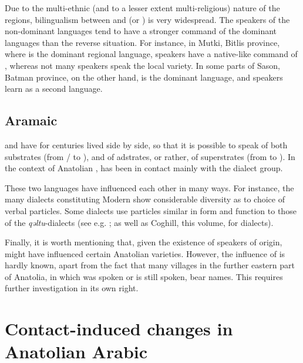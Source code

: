 \documentclass[output=paper]{langsci/langscibook}
\begin{document}
Due to the multi-ethnic (and to a lesser extent multi-religious) nature of the regions, {bilingualism} between  and  (or ) is very widespread. The speakers of the non-dominant languages tend to have a stronger command of the dominant languages than the reverse situation. For instance, in Mutki, Bitlis province, where  is the dominant regional language,  speakers have a native-like command of , whereas not many  speakers speak the local  variety. In some parts of Sason, Batman province, on the other hand,  is the dominant language, and  speakers learn  as a second language.

\subsection{Aramaic}
 and  have for centuries lived side by side, so that it is possible to speak of both substrates (from / to ), and of adstrates, or rather, of superstrates (from  to ). In the context of Anatolian ,  has been in contact mainly with the  dialect group.


These two languages have influenced each other in many ways. For instance, the many dialects constituting Modern  show considerable diversity as to choice of verbal particles. Some dialects use particles similar in form and function to those of the \textit{qəltu}-dialects (see e.g. \citealt{Jastrow1985}; as well as Coghill, this volume, for  dialects).

Finally, it is worth mentioning that, given the existence of  speakers of  origin,  might have influenced certain Anatolian  varieties. However, the influence of  is hardly known, apart from the fact that many villages in the further eastern part of {Anatolia}, in which  was spoken or is still spoken, bear  names. This requires further investigation in its own right.

\section{Contact-induced changes in Anatolian Arabic}
\end{document}
